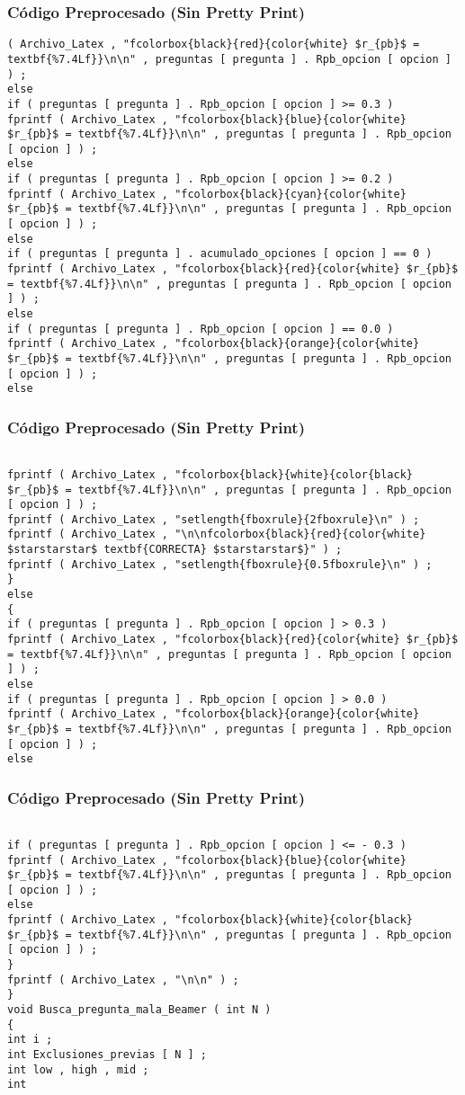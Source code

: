 \documentclass{beamer}
\begin{document}
\begin{frame}[fragile]
\frametitle{C\'odigo Preprocesado (Sin Pretty Print)}
\begin{lstlisting}[style=CStyle]
( Archivo_Latex , "fcolorbox{black}{red}{color{white} $r_{pb}$ = textbf{%7.4Lf}}\n\n" , preguntas [ pregunta ] . Rpb_opcion [ opcion ] ) ; 
else 
if ( preguntas [ pregunta ] . Rpb_opcion [ opcion ] >= 0.3 ) 
fprintf ( Archivo_Latex , "fcolorbox{black}{blue}{color{white} $r_{pb}$ = textbf{%7.4Lf}}\n\n" , preguntas [ pregunta ] . Rpb_opcion [ opcion ] ) ; 
else 
if ( preguntas [ pregunta ] . Rpb_opcion [ opcion ] >= 0.2 ) 
fprintf ( Archivo_Latex , "fcolorbox{black}{cyan}{color{white} $r_{pb}$ = textbf{%7.4Lf}}\n\n" , preguntas [ pregunta ] . Rpb_opcion [ opcion ] ) ; 
else 
if ( preguntas [ pregunta ] . acumulado_opciones [ opcion ] == 0 ) 
fprintf ( Archivo_Latex , "fcolorbox{black}{red}{color{white} $r_{pb}$ = textbf{%7.4Lf}}\n\n" , preguntas [ pregunta ] . Rpb_opcion [ opcion ] ) ; 
else 
if ( preguntas [ pregunta ] . Rpb_opcion [ opcion ] == 0.0 ) 
fprintf ( Archivo_Latex , "fcolorbox{black}{orange}{color{white} $r_{pb}$ = textbf{%7.4Lf}}\n\n" , preguntas [ pregunta ] . Rpb_opcion [ opcion ] ) ; 
else \end{lstlisting}
\end{frame}
\begin{frame}[fragile]
\frametitle{C\'odigo Preprocesado (Sin Pretty Print)}
\begin{lstlisting}[style=CStyle]

fprintf ( Archivo_Latex , "fcolorbox{black}{white}{color{black} $r_{pb}$ = textbf{%7.4Lf}}\n\n" , preguntas [ pregunta ] . Rpb_opcion [ opcion ] ) ; 
fprintf ( Archivo_Latex , "setlength{fboxrule}{2fboxrule}\n" ) ; 
fprintf ( Archivo_Latex , "\n\nfcolorbox{black}{red}{color{white} $starstarstar$ textbf{CORRECTA} $starstarstar$}" ) ; 
fprintf ( Archivo_Latex , "setlength{fboxrule}{0.5fboxrule}\n" ) ; 
} 
else 
{ 
if ( preguntas [ pregunta ] . Rpb_opcion [ opcion ] > 0.3 ) 
fprintf ( Archivo_Latex , "fcolorbox{black}{red}{color{white} $r_{pb}$ = textbf{%7.4Lf}}\n\n" , preguntas [ pregunta ] . Rpb_opcion [ opcion ] ) ; 
else 
if ( preguntas [ pregunta ] . Rpb_opcion [ opcion ] > 0.0 ) 
fprintf ( Archivo_Latex , "fcolorbox{black}{orange}{color{white} $r_{pb}$ = textbf{%7.4Lf}}\n\n" , preguntas [ pregunta ] . Rpb_opcion [ opcion ] ) ; 
else \end{lstlisting}
\end{frame}
\begin{frame}[fragile]
\frametitle{C\'odigo Preprocesado (Sin Pretty Print)}
\begin{lstlisting}[style=CStyle]

if ( preguntas [ pregunta ] . Rpb_opcion [ opcion ] <= - 0.3 ) 
fprintf ( Archivo_Latex , "fcolorbox{black}{blue}{color{white} $r_{pb}$ = textbf{%7.4Lf}}\n\n" , preguntas [ pregunta ] . Rpb_opcion [ opcion ] ) ; 
else 
fprintf ( Archivo_Latex , "fcolorbox{black}{white}{color{black} $r_{pb}$ = textbf{%7.4Lf}}\n\n" , preguntas [ pregunta ] . Rpb_opcion [ opcion ] ) ; 
} 
fprintf ( Archivo_Latex , "\n\n" ) ; 
} 
void Busca_pregunta_mala_Beamer ( int N ) 
{ 
int i ; 
int Exclusiones_previas [ N ] ; 
int low , high , mid ; 
int \end{lstlisting}
\end{frame}
\end{document}
